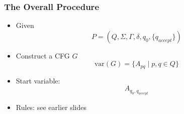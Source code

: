 
\usepackage{CJKutf8}




\begin{frame}[allowframebreaks]
  \frametitle{The Overall Procedure}
  \begin{itemize}
  \item Given
    \begin{equation*}
    P=(Q,\Sigma, \Gamma, \delta, q_0, \{q_{accept}\})
  \end{equation*}
  \item Construct a CFG $G$
    \begin{equation*}
\text{var}(G) =\{A_{pq}\mid p, q \in Q\}
\end{equation*}
\item Start variable:
  \begin{equation*}
  A_{q_0, q_{accept}}
\end{equation*}

\item Rules: see earlier slides
  \end{itemize}
\end{frame}

